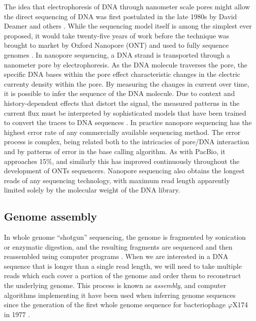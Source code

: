 The idea that electrophoresis of DNA through nanometer scale pores might allow the direct sequencing of DNA was first postulated in the late 1980s by David Deamer and others \cite{deamer2016three}.
While the sequencing model itself is among the simplest ever proposed, it would take twenty-five years of work \cite{kasianowicz1996characterization,purnell2008nucleotide} before the technique was brought to market by Oxford Nanopore (ONT) \cite{mikheyev2014first} and used to fully sequence genomes \cite{loman2015complete, jain2018nanopore}.
In nanopore sequencing, a DNA strand is transported through a nanometer pore by electrophoresis.
As the DNA molecule traverses the pore, the specific DNA bases within the pore effect characteristic changes in the electric currenty density within the pore.
By measuring the changes in current over time, it is possible to infer the sequence of the DNA molecule.
Due to context and history-dependent effects that distort the signal, the measured patterns in the current flux must be interpreted by sophisticated models that have been trained to convert the traces to DNA sequences \cite{david2016nanocall}.
In practice nanopore sequencing has the highest error rate of any commercially available sequencing method.
The error process is complex, being related both to the intricacies of pore/DNA interaction and by patterns of error in the base calling algorithm.
As with PacBio, it approaches 15\%, and similarly this has improved continuously throughout the development of ONTs sequencers.
Nanopore sequencing also obtains the longest reads of any sequencing technology, with maximum read length apparently limited solely by the molecular weight of the DNA library.


\subsection{Genome assembly}

In whole genome ``shotgun'' sequencing, the genome is fragmented by sonication or enzymatic digestion, and the resulting fragments are sequenced and then reassembled using computer programs \cite{gardner1981complete, sanger1982nucleotide}.
When we are interested in a DNA sequence that is longer than a single read length, we will need to take multiple reads which each cover a portion of the genome and order them to reconstruct the underlying genome.
This process is known as \emph{assembly}, and computer algorithms implementing it have been used when inferring genome sequences since the generation of the first whole genome sequence for bacteriophage $\varphi$X174 in 1977 \cite{sanger1977nucleotide, staden1979strategy}.

